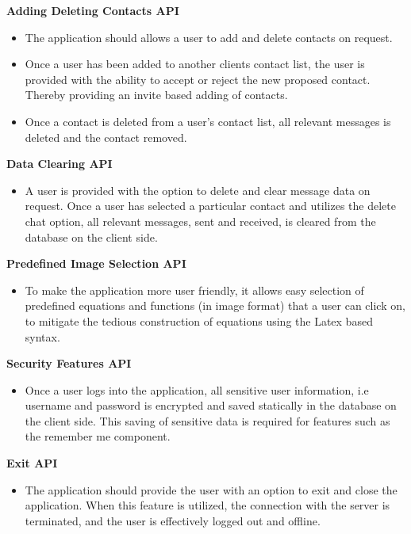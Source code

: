 \documentclass[29pt,a4paper]{moderncv}
\begin{document}
		\noindent\textbf{Adding Deleting Contacts API}
			\begin{itemize}
				\item The application should allows a user to add and delete contacts on request.
				\item Once a user has been added to another clients contact list, the user is provided with the ability to accept or reject the new proposed contact. Thereby providing an invite based adding of contacts.
				\item Once a contact is deleted from a user’s contact list, all relevant messages is deleted and the contact removed.
				\\		
			\end{itemize}	
			
		\noindent\textbf{Data Clearing API}
			\begin{itemize}
				\item A user is provided with the option to delete and clear message data on request. Once a user has selected a particular contact and utilizes the delete chat option, all relevant messages, sent and received, is cleared from the database on the client side.
				\\		
			\end{itemize}	
			
		\noindent\textbf{Predefined Image Selection API}
			\begin{itemize}
				\item To make the application more user friendly, it allows easy selection of predefined equations and functions (in image format) that a user can click on, to mitigate the tedious construction of equations using the Latex based syntax.
				\\		
			\end{itemize}
			
		\noindent\textbf{Security Features API}
			\begin{itemize}
				\item Once a user logs into the application, all sensitive user information, i.e username and password is encrypted and saved statically in the database on the client side.  This saving of sensitive data is required for features such as the remember me component.
				\\		
			\end{itemize}
		
		\noindent\textbf{Exit API}
			\begin{itemize}
				\item The application should provide the user with an option to exit and close the application. When this feature is utilized, the connection with the server is terminated, and the user is effectively logged out and offline.
				\\		
			\end{itemize}
			
\end{document}

